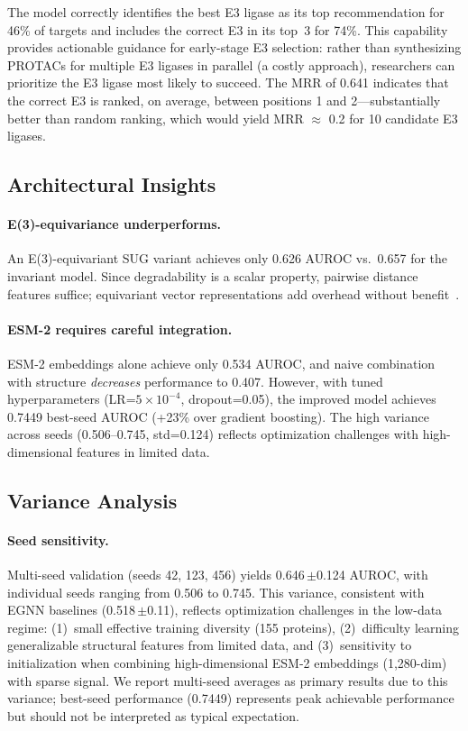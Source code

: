 \documentclass[sigconf]{acmart}
\newcommand{\spm}[1]{{\scriptsize$\pm$#1}}
\begin{document}
The model correctly identifies the best E3 ligase as its top recommendation for 46\% of targets and includes the correct E3 in its top~3 for 74\%.
This capability provides actionable guidance for early-stage E3 selection: rather than synthesizing PROTACs for multiple E3 ligases in parallel (a costly approach), researchers can prioritize the E3 ligase most likely to succeed.
The MRR of 0.641 indicates that the correct E3 is ranked, on average, between positions 1 and 2---substantially better than random ranking, which would yield MRR $\approx$ 0.2 for 10 candidate E3 ligases.

\subsection{Architectural Insights}
\label{sec:equivariant}

\paragraph{E(3)-equivariance underperforms.}
An E(3)-equivariant SUG variant achieves only 0.626 AUROC vs.\ 0.657 for the invariant model.
Since degradability is a scalar property, pairwise distance features suffice; equivariant vector representations add overhead without benefit~\cite{zhang2023gearnet}.

\paragraph{ESM-2 requires careful integration.}
\label{sec:esm_integration}
ESM-2 embeddings alone achieve only 0.534 AUROC, and naive combination with structure \emph{decreases} performance to 0.407.
However, with tuned hyperparameters (LR=$5\times10^{-4}$, dropout=0.05), the improved model achieves 0.7449 best-seed AUROC (+23\% over gradient boosting).
The high variance across seeds (0.506--0.745, std=0.124) reflects optimization challenges with high-dimensional features in limited data.

\subsection{Variance Analysis}
\label{sec:multiseed}

\paragraph{Seed sensitivity.}
Multi-seed validation (seeds 42, 123, 456) yields 0.646\,\spm{0.124} AUROC, with individual seeds ranging from 0.506 to 0.745.
This variance, consistent with EGNN baselines (0.518\,\spm{0.11}), reflects optimization challenges in the low-data regime: (1)~small effective training diversity (155 proteins), (2)~difficulty learning generalizable structural features from limited data, and (3)~sensitivity to initialization when combining high-dimensional ESM-2 embeddings (1,280-dim) with sparse signal.
We report multi-seed averages as primary results due to this variance; best-seed performance (0.7449) represents peak achievable performance but should not be interpreted as typical expectation.
\end{document}
